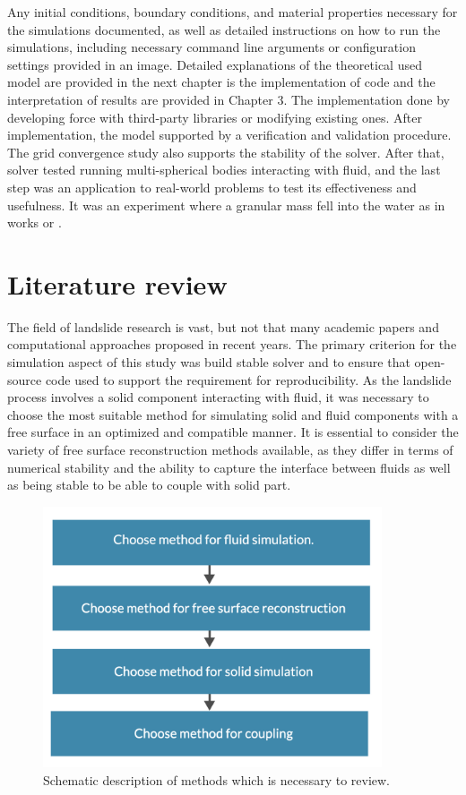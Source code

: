 Any initial conditions, boundary conditions, and material properties necessary for the simulations documented, as well as detailed instructions on how to run the simulations, including necessary command line arguments or configuration settings provided in an image. Detailed explanations of the theoretical used model are provided in the next chapter is the implementation of code and the interpretation of results are provided in Chapter 3. The implementation done by developing force with third-party libraries or modifying existing ones. After implementation, the model supported by a verification and validation procedure. The grid convergence study also supports the stability of the solver. After that,  solver tested running multi-spherical bodies interacting with fluid, and the last step was an application to real-world problems to test its effectiveness and usefulness. It was an experiment where a granular mass fell into the water as in works \cite{mao2020resolved} or \cite{shen2022resolved}.

\section{Literature review}

The field of landslide research is vast, but not that many academic papers and computational approaches proposed in recent years. The primary criterion for the simulation aspect of this study was build stable solver and to ensure that  open-source code used to support the requirement for reproducibility. As the landslide process involves a solid component interacting with fluid, it was necessary to choose the most suitable method for simulating solid and fluid components with a free surface in an optimized and compatible manner. It is essential to consider the variety of free surface reconstruction methods available, as they differ in terms of numerical stability and the ability to capture the interface between fluids as well as being stable to be able to couple with solid part. 

\begin{figure}[!ht]
    \centering
    \includegraphics[width=10cm]{GWU_Thesis_Sarmakeeva/Images/chap1/lit_rew.png}
    \caption{Schematic description of methods which is necessary to review.}
    \label{fig:aims}
\end{figure}

